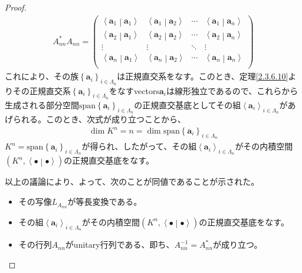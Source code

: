 \documentclass[dvipdfmx]{jsarticle}
\begin{document}
\begin{proof}
\begin{align*}
A_{nn}^{*}A_{nn} = \begin{pmatrix}
\left\langle \mathbf{a}_{1} \middle| \mathbf{a}_{1} \right\rangle & \left\langle \mathbf{a}_{1} \middle| \mathbf{a}_{2} \right\rangle & \cdots & \left\langle \mathbf{a}_{1} \middle| \mathbf{a}_{n} \right\rangle \\
\left\langle \mathbf{a}_{2} \middle| \mathbf{a}_{1} \right\rangle & \left\langle \mathbf{a}_{2} \middle| \mathbf{a}_{2} \right\rangle & \cdots & \left\langle \mathbf{a}_{2} \middle| \mathbf{a}_{n} \right\rangle \\
 \vdots & \vdots & \ddots & \vdots \\
\left\langle \mathbf{a}_{n} \middle| \mathbf{a}_{1} \right\rangle & \left\langle \mathbf{a}_{n} \middle| \mathbf{a}_{2} \right\rangle & \cdots & \left\langle \mathbf{a}_{n} \middle| \mathbf{a}_{n} \right\rangle \\
\end{pmatrix}
\end{align*}
これにより、その族$\left\{ \mathbf{a}_{i} \right\}_{i \in \varLambda_{n}}$は正規直交系をなす。このとき、定理\ref{2.3.6.10}よりその正規直交系$\left\{ \mathbf{a}_{i} \right\}_{i \in \varLambda_{n}}$をなすvectors$\mathbf{a}_{i}$は線形独立であるので、これらから生成される部分空間${\mathrm{span}}\left\{ \mathbf{a}_{i} \right\}_{i \in \varLambda_{n}}$の正規直交基底としてその組$\left\langle \mathbf{a}_{i} \right\rangle_{i \in \varLambda_{n}}$があげられる。このとき、次式が成り立つことから、
\begin{align*}
\dim K^{n} = n = \dim {\mathrm{span}}\left\{ \mathbf{a}_{i} \right\}_{i \in \varLambda_{n}}
\end{align*}
$K^{n} = {\mathrm{span}}\left\{ \mathbf{a}_{i} \right\}_{i \in \varLambda_{n}}$が得られ、したがって、その組$\left\langle \mathbf{a}_{i} \right\rangle_{i \in \varLambda_{n}}$がその内積空間$\left( K^{n},\left\langle \bullet \middle| \bullet \right\rangle \right)$の正規直交基底をなす。\par
以上の議論により、よって、次のことが同値であることが示された。
\begin{itemize}
\item
  その写像$L_{A_{nn}}$が等長変換である。
\item
  その組$\left\langle \mathbf{a}_{i} \right\rangle_{i \in \varLambda_{n}}$がその内積空間$\left( K^{n},\left\langle \bullet \middle| \bullet \right\rangle \right)$の正規直交基底をなす。
\item
  その行列$A_{nn}$がunitary行列である、即ち、$A_{nn}^{- 1} = A_{nn}^{*}$が成り立つ。
\end{itemize}
\end{proof}
\end{document}
